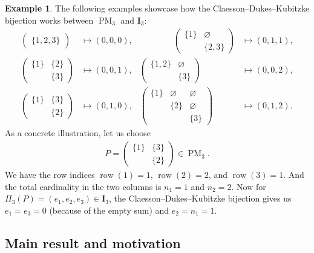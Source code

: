 \documentclass[12pt,reqno]{amsart}
\numberwithin{equation}{section}
\theoremstyle{theorem}
\theoremstyle{definition}
\newtheorem{example}[theorem]{Example}
\theoremstyle{named}
\newcommand{\MatP}{\operatorname{PM}}
\newcommand{\row}{\operatorname{row}}
\newcommand{\bI}{\mathbf{I}}
\begin{document}
\begin{example}\label{ex:CDK-bij}
	The following examples showcase how the Claesson--Dukes--Kubitzke bijection works between $\MatP_3$ and $\bI_3$:
	\begin{align*}
		\begin{pmatrix}
			\{1,2,3\}
		\end{pmatrix} & \mapsto (0,0,0), & \qquad\qquad \begin{pmatrix}
			\{1\} & \varnothing \\
			& \{2,3\}
		\end{pmatrix} & \mapsto (0,1,1),\\
		\begin{pmatrix}
			\{1\} & \{2\} \\
			& \{3\}
		\end{pmatrix} & \mapsto (0,0,1), & \begin{pmatrix}
			\{1,2\} & \varnothing \\
			& \{3\}
		\end{pmatrix} & \mapsto (0,0,2),\\
		\begin{pmatrix}
			\{1\} & \{3\} \\
			& \{2\}
		\end{pmatrix} & \mapsto (0,1,0), & \begin{pmatrix}
			\{1\} & \varnothing & \varnothing \\
			& \{2\} & \varnothing \\
			& & \{3\}
		\end{pmatrix} & \mapsto (0,1,2).
	\end{align*}
	As a concrete illustration, let us choose
	\begin{align*}
		P = \begin{pmatrix}
			\{1\} & \{3\} \\
			& \{2\}
		\end{pmatrix}\in \MatP_3.
	\end{align*}
	We have the row indices $\row(1)=1$, $\row(2)=2$, and $\row(3)=1$. And the total cardinality in the two columns is $n_1 = 1$ and $n_2 = 2$. Now for $\Pi_3(P) = (e_1, e_2, e_3) \in \bI_3$, the Claesson--Dukes--Kubitzke bijection gives us $e_1 = e_3 = 0$ (because of the empty sum) and $e_2 = n_1 = 1$.
\end{example}


\subsection{Main result and motivation}\label{sec:main-result}
\end{document}
